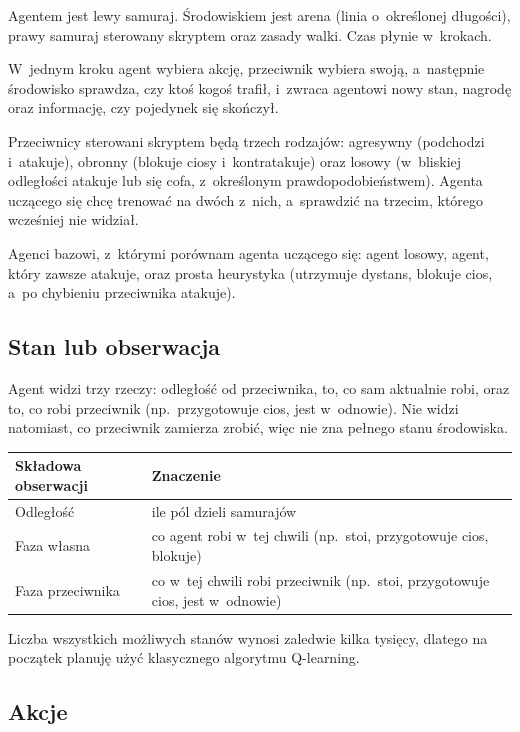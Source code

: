 \documentclass[12pt]{article}
\begin{document}
Agentem jest lewy samuraj. Środowiskiem jest arena (linia o~określonej długości), prawy samuraj sterowany skryptem oraz zasady walki. Czas płynie w~krokach.

W~jednym kroku agent wybiera akcję, przeciwnik wybiera swoją, a~następnie środowisko sprawdza, czy ktoś kogoś trafił, i~zwraca agentowi nowy stan, nagrodę oraz informację, czy pojedynek się skończył.

Przeciwnicy sterowani skryptem będą trzech rodzajów: agresywny (podchodzi i~atakuje), obronny (blokuje ciosy i~kontratakuje) oraz losowy (w~bliskiej odległości atakuje lub się cofa, z~określonym prawdopodobieństwem). Agenta uczącego się chcę trenować na dwóch z~nich, a~sprawdzić na trzecim, którego wcześniej nie widział.

Agenci bazowi, z~którymi porównam agenta uczącego się: agent losowy, agent, który zawsze atakuje, oraz prosta heurystyka (utrzymuje dystans, blokuje cios, a~po chybieniu przeciwnika atakuje).

\subsection{Stan lub obserwacja}

Agent widzi trzy rzeczy: odległość od przeciwnika, to, co sam aktualnie robi, oraz to, co robi przeciwnik (np.\ przygotowuje cios, jest w~odnowie). Nie widzi natomiast, co przeciwnik zamierza zrobić, więc nie zna pełnego stanu środowiska.

\begin{center}
\begin{tabular}{p{}p{}}
\toprule
Składowa obserwacji & Znaczenie \\
\midrule
Odległość & ile pól dzieli samurajów \\
Faza własna & co agent robi w~tej chwili (np.\ stoi, przygotowuje cios, blokuje) \\
Faza przeciwnika & co w~tej chwili robi przeciwnik (np.\ stoi, przygotowuje cios, jest w~odnowie) \\
\bottomrule
\end{tabular}
\end{center}

Liczba wszystkich możliwych stanów wynosi zaledwie kilka tysięcy, dlatego na początek planuję użyć klasycznego algorytmu Q-learning.

\subsection{Akcje}
\end{document}
